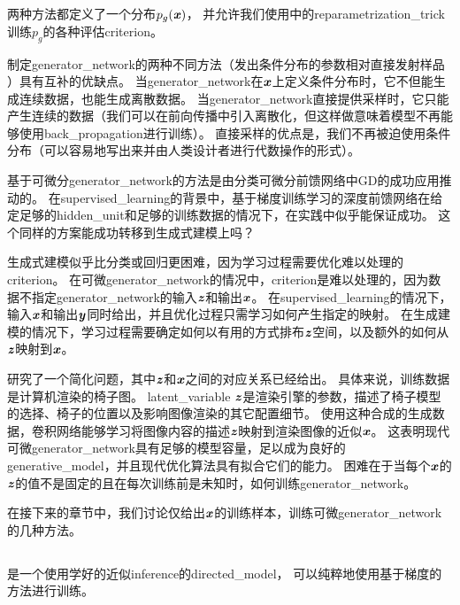 两种方法都定义了一个分布$p_g(\boldsymbol{\mathit{x}})$， 并允许我们使用中的\gls{reparametrization_trick}训练$p_g$的各种评估\gls{criterion}。


制定\gls{generator_network}的两种不同方法（发出条件分布的参数相对直接发射样品 ）具有互补的优缺点。
当\gls{generator_network}在$\boldsymbol{\mathit{x}}$上定义条件分布时，它不但能生成连续数据，也能生成离散数据。
当\gls{generator_network}直接提供采样时，它只能产生连续的数据（我们可以在前向传播中引入离散化，但这样做意味着模型不再能够使用\gls{back_propagation}进行训练）。
直接采样的优点是，我们不再被迫使用条件分布（可以容易地写出来并由人类设计者进行代数操作的形式）。

基于可微分\gls{generator_network}的方法是由分类可微分前馈网络中\gls{GD}的成功应用推动的。
在\gls{supervised_learning}的背景中，基于梯度训练学习的深度前馈网络在给定足够的\gls{hidden_unit}和足够的训练数据的情况下，在实践中似乎能保证成功。
这个同样的方案能成功转移到生成式建模上吗？

生成式建模似乎比分类或回归更困难，因为学习过程需要优化难以处理的\gls{criterion}。
在可微\gls{generator_network}的情况中，\gls{criterion}是难以处理的，因为数据不指定\gls{generator_network}的输入$\boldsymbol{\mathit{z}}$和输出$\boldsymbol{\mathit{x}}$。
在\gls{supervised_learning}的情况下，输入$\boldsymbol{\mathit{x}}$和输出$\boldsymbol{\mathit{y}}$同时给出，并且优化过程只需学习如何产生指定的映射。
在生成建模的情况下，学习过程需要确定如何以有用的方式排布$\boldsymbol{\mathit{z}}$空间，以及额外的如何从$\boldsymbol{\mathit{z}}$映射到$\boldsymbol{\mathit{x}}$。

\citet{dosovitskiy2015learning}研究了一个简化问题，其中$\boldsymbol{\mathit{z}}$和$\boldsymbol{\mathit{x}}$之间的对应关系已经给出。
具体来说，训练数据是计算机渲染的椅子图。
\gls{latent_variable} $\boldsymbol{\mathit{z}}$是渲染引擎的参数，描述了椅子模型的选择、椅子的位置以及影响图像渲染的其它配置细节。
使用这种合成的生成数据，卷积网络能够学习将图像内容的描述$\boldsymbol{\mathit{z}}$映射到渲染图像的近似$\boldsymbol{\mathit{x}}$。
这表明现代可微\gls{generator_network}具有足够的模型容量，足以成为良好的\gls{generative_model}，并且现代优化算法具有拟合它们的能力。
困难在于当每个$\boldsymbol{\mathit{x}}$的$\boldsymbol{\mathit{z}}$的值不是固定的且在每次训练前是未知时，如何训练\gls{generator_network}。


在接下来的章节中，我们讨论仅给出$\boldsymbol{\mathit{x}}$的训练样本，训练可微\gls{generator_network}的几种方法。


\subsection{}
\label{sec:variational_autoencoders}
\citep{Kingma-arxiv2013,Rezende-et-al-ICML2014}是一个使用学好的近似\gls{inference}的\gls{directed_model}， 可以纯粹地使用基于梯度的方法进行训练。


